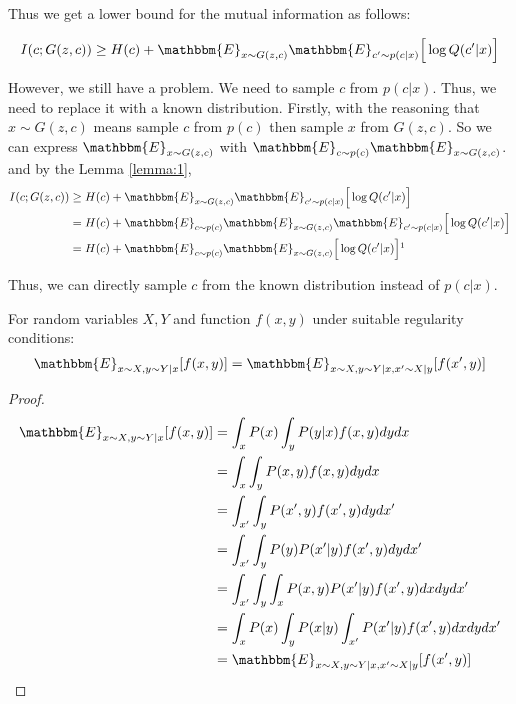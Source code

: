 Thus we get a lower bound for the mutual information as follows:

$$I(c;G(z,c)) \geq H(c) + \mathbbm{E}_{x\sim G(z,c)}\mathbbm{E}_{c'\sim p(c|x)}\Big[\log Q(c'|x)\Big]$$

However, we still have a problem. We need to sample $c$ from $p(c|x)$. Thus, we need to replace it with a known distribution. Firstly, with the reasoning that $x\sim G(z,c)$ means sample $c$ from $p(c)$ then sample $x$ from $G(z,c)$. So we can express $\mathbbm{E}_{x\sim G(z,c)}$ with $\mathbbm{E}_{c\sim p(c)}\mathbbm{E}_{x\sim G(z,c)}$. and by the Lemma \ref{lemma:1}, 
\begin{align*}
I(c;G(z,c)) &\geq H(c) + \mathbbm{E}_{x\sim G(z,c)}\mathbbm{E}_{c'\sim p(c|x)}\Big[\log Q(c'|x)\Big]\\
&= H(c) + \mathbbm{E}_{c\sim p(c)}\mathbbm{E}_{x\sim G(z,c)}\mathbbm{E}_{c'\sim p(c|x)}\Big[\log Q(c'|x)\Big]\\
& = H(c) + \mathbbm{E}_{c\sim p(c)}\mathbbm{E}_{x\sim G(z,c)}\Big[\log Q(c'|x)\Big] \footnotemark
\end{align*}

Thus, we can directly sample $c$ from the known distribution instead of $p(c|x)$.

\begin{lemma}
	For random variables $X, Y$ and function $f(x, y)$ under suitable regularity conditions:
	$$\mathbbm{E}_{x\sim X, y\sim Y|x}[f(x,y)] = \mathbbm{E}_{x\sim X, y\sim Y|x, x'\sim X|y}[f(x',y)]$$
	\begin{proof}
		\begin{align*}
		\mathbbm{E}_{x\sim X, y\sim Y|x}[f(x,y)] &=\int_x P(x)\int_y P(y|x)f(x,y)dydx\\
		& = \int_x\int_yP(x,y)f(x,y)dydx\\
		& = \int_{x'}\int_yP(x',y)f(x',y)dydx'\\
		& = \int_{x'}\int_y P(y)P(x'|y)f(x',y)dydx'\\
		& = \int_{x'}\int_y\int_{x} P(x,y)P(x'|y)f(x',y)dxdydx'\\
		& = \int_{x}P(x)\int_y P(x|y) \int_{x'} P(x'|y)f(x',y)dxdydx'\\
		& = \mathbbm{E}_{x\sim X, y\sim Y|x, x'\sim X|y}[f(x',y)]
		\end{align*}
	\end{proof}
	\label{lemma:1}
\end{lemma} 
